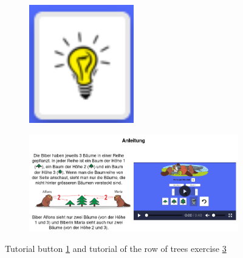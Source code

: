 \begin{figure}[h]
    \centering
    \begin{subfigure}[b]{0.25\textwidth}
        \centering
        \includegraphics[width=0.5\textwidth]{figures/tutorial_button.png}
        \subcaption{}
        \label{fig:tutorialButton} 
    \end{subfigure}
    \begin{subfigure}[b]{0.7\textwidth}
        \centering
        \includegraphics[width=\textwidth]{figures/tutorial_example.png}
        \subcaption{}
        \label{fig:tutorialExample} 
    \end{subfigure}
    \caption{Tutorial button \ref{fig:tutorialButton} and tutorial of the row of trees exercise \ref{fig:tutorialExample}}
\end{figure}